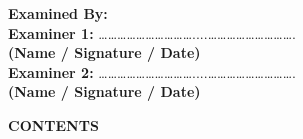 \documentclass[12pt,a4paper]{report}
\begin{document}
\textbf{Examined By:}\\[0.3cm]
\hspace{1cm} \textbf{Examiner 1:} \hspace{0.2cm} …………………………....……………………….\\
\hspace{6cm} \textbf{(Name / Signature / Date)}\\[0.8cm]

\hspace{1cm} \textbf{Examiner 2:} \hspace{0.2cm} …………………………....……………………….\\
\hspace{6cm} \textbf{(Name / Signature / Date)}

\newpage
\thispagestyle{empty} %
\centering
\textbf{\LARGE CONTENTS}\\[1cm]
\end{document}
